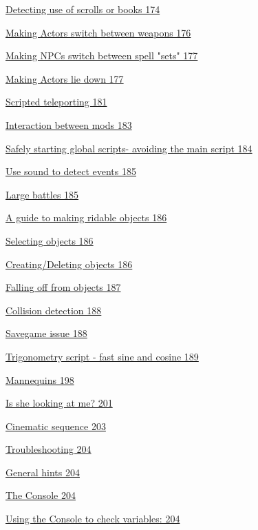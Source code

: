 \documentclass[
]{article}
\begin{document}
\protect\hyperlink{detecting-use-of-scrolls-or-books}{Detecting use of
scrolls or books 174}

\protect\hyperlink{making-actors-switch-between-weapons}{Making Actors
switch between weapons 176}

\protect\hyperlink{_Toc182634679}{Making NPCs switch between spell
"sets" 177}

\protect\hyperlink{making-actors-lie-down}{Making Actors lie down 177}

\protect\hyperlink{scripted-teleporting}{Scripted teleporting 181}

\protect\hyperlink{interaction-between-mods}{Interaction between mods
183}

\protect\hyperlink{safely-starting-global-scripts--avoiding-the-main-script}{Safely
starting global scripts- avoiding the main script 184}

\protect\hyperlink{use-sound-to-detect-events}{Use sound to detect
events 185}

\protect\hyperlink{large-battles}{Large battles 185}

\protect\hyperlink{a-guide-to-making-ridable-objects}{A guide to making
ridable objects 186}

\protect\hyperlink{selecting-objects}{Selecting objects 186}

\protect\hyperlink{creatingdeleting-objects}{Creating/Deleting objects
186}

\protect\hyperlink{falling-off-from-objects}{Falling off from objects
187}

\protect\hyperlink{collision-detection}{Collision detection 188}

\protect\hyperlink{savegame-issue}{Savegame issue 188}

\protect\hyperlink{trigonometry-script---fast-sine-and-cosine}{Trigonometry
script - fast sine and cosine 189}

\protect\hyperlink{mannequins}{Mannequins 198}

\protect\hyperlink{is-she-looking-at-me}{Is she looking at me? 201}

\protect\hyperlink{cinematic-sequence}{Cinematic sequence 203}

\protect\hyperlink{troubleshooting}{Troubleshooting 204}

\protect\hyperlink{general-hints}{General hints 204}

\protect\hyperlink{the-console}{The Console 204}

\protect\hyperlink{using-the-console-to-check-variables}{Using the
Console to check variables: 204}
\end{document}
